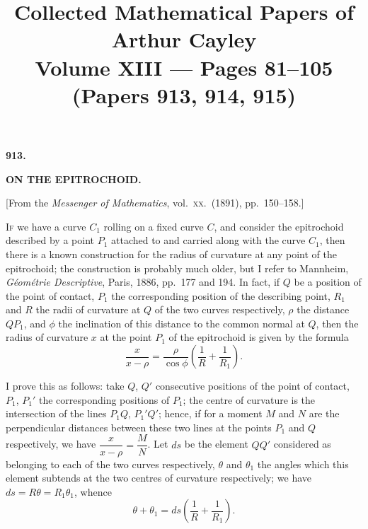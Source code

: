 \documentclass[11pt]{article}
\title{Collected Mathematical Papers of Arthur Cayley\\
Volume XIII --- Pages 81--105\\
(Papers 913, 914, 915)}
\author{}
\date{}
\begin{document}
\maketitle


\begin{center}\large\textbf{913.}\end{center}
\begin{center}\large\textbf{ON THE EPITROCHOID.}\end{center}
\vspace{0.5em}
\begin{center}\small[From the \emph{Messenger of Mathematics}, vol.\ \textsc{xx}.\ (1891), pp.\ 150--158.]\end{center}
\vspace{1em}

\hspace{1em} I\textsc{f} we have a curve $C_{1}$ rolling on a fixed curve $C$, and
consider the epitrochoid described by a point $P_{1}$ attached to and carried
along with the curve $C_{1}$, then there is a known construction for the radius
of curvature at any point of the epitrochoid; the construction is probably much
older, but I refer to Mannheim, \emph{G\'eom\'etrie Descriptive}, Paris, 1886,
pp.\ 177 and 194. In fact, if $Q$ be a position of the point of contact,
$P_{1}$ the corresponding position of the describing point, $R_{1}$ and $R$ the
radii of curvature at $Q$ of the two curves respectively, $\rho$ the distance
$QP_{1}$, and $\phi$ the inclination of this distance to the common normal at
$Q$, then the radius of curvature $x$ at the point $P_{1}$ of the epitrochoid
is given by the formula
\[
\frac{x}{x-\rho}=\frac{\rho}{\cos\phi}\left(\frac{1}{R}+\frac{1}{R_{1}}\right).
\]

\hspace{1em} I prove this as follows: take $Q$, $Q'$ consecutive positions of
the point of contact, $P_{1}$, $P_{1}'$ the corresponding positions of $P_{1}$;
the centre of curvature is the intersection of the lines $P_{1}Q$,
$P_{1}'Q'$; hence, if for a moment $M$ and $N$ are the perpendicular distances
between these two lines at the points $P_{1}$ and $Q$ respectively, we have
$\dfrac{x}{x-\rho}=\dfrac{M}{N}$. Let $ds$ be the element $QQ'$ considered as
belonging to each of the two curves respectively, $\theta$ and $\theta_{1}$ the
angles which this element subtends at the two centres of curvature
respectively; we have $ds=R\theta=R_{1}\theta_{1}$, whence
\[
\theta+\theta_{1}=ds\left(\frac{1}{R}+\frac{1}{R_{1}}\right).
\]
\end{document}
